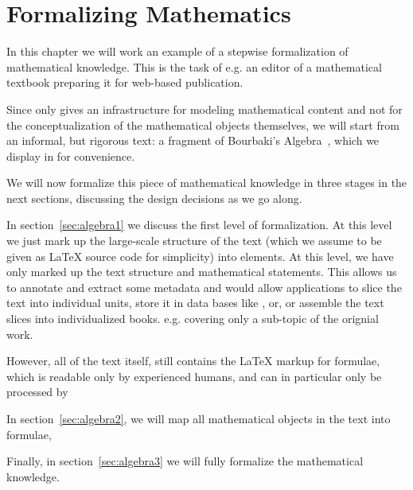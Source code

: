 \chapter{Formalizing Mathematics}
\label{cha:algebra}

In this chapter we will work an example of a stepwise formalization of
mathematical knowledge. This is the task of e.g. an editor of a mathematical
textbook preparing it for web-based publication. 

Since {\omdoc} only gives an infrastructure for modeling mathematical content and
not for the conceptualization of the mathematical objects themselves, we will
start from an informal, but rigorous text: a fragment of Bourbaki's
Algebra~\cite{Bourbaki:a74}, which we display in {} for
convenience.

We will now formalize this piece of mathematical knowledge in three stages in the
next sections, discussing the design decisions as we go along.

In section~\ref{sec:algebra1} we discuss the first level of formalization. At this
level we just mark up the large-scale structure of the text (which we assume to be
given as {\LaTeX} source code for simplicity) into {\omdoc} elements. At this
level, we have only marked up the text structure and mathematical statements. This
allows us to annotate and extract some metadata and would allow applications to
slice the text into individual units, store it in data bases like {\mbase},
or, or assemble the text slices into individualized books.
e.g. covering only a sub-topic of the orignial work.

However, all of the text itself, still contains the {\LaTeX} markup for formulae,
which is readable only by experienced humans, and can in particular only be
processed by


In section~\ref{sec:algebra2}, we will map all mathematical objects in the text
into {\openmath} formulae, 

Finally, in section~\ref{sec:algebra3} we will fully formalize the mathematical
knowledge.  



